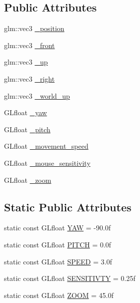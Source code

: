 \subsection*{Public Attributes}
\begin{DoxyCompactItemize}
\item 
glm\+::vec3 \hyperlink{classCamera_a0a931ed2051befaad1f482b3b5e98ca0}{\+\_\+position}
\item 
glm\+::vec3 \hyperlink{classCamera_ac610e748840c4b70c9081c2d68df2e8d}{\+\_\+front}
\item 
glm\+::vec3 \hyperlink{classCamera_a323a698e4c5773ee3ec380851b145e2d}{\+\_\+up}
\item 
glm\+::vec3 \hyperlink{classCamera_a4c556280ed181d8589c28eec7ebebb49}{\+\_\+right}
\item 
glm\+::vec3 \hyperlink{classCamera_aa5d721a01ba1cb41eafb02e39ea29e03}{\+\_\+world\+\_\+up}
\item 
G\+Lfloat \hyperlink{classCamera_ab815461cc043db1f5810c2f488641740}{\+\_\+yaw}
\item 
G\+Lfloat \hyperlink{classCamera_a23a8b8859c44721d7082b89809318918}{\+\_\+pitch}
\item 
G\+Lfloat \hyperlink{classCamera_a6f31b5658310866d3228614a755b59b0}{\+\_\+movement\+\_\+speed}
\item 
G\+Lfloat \hyperlink{classCamera_aeb483d642e0bcf11aa881467ac9676fe}{\+\_\+mouse\+\_\+sensitivity}
\item 
G\+Lfloat \hyperlink{classCamera_a99dc4d95f58be2427ff6c8d93c676ecd}{\+\_\+zoom}
\end{DoxyCompactItemize}
\subsection*{Static Public Attributes}
\begin{DoxyCompactItemize}
\item 
static const G\+Lfloat \hyperlink{classCamera_a79050e94e98c5c1cc0127c41edb4ed16}{Y\+AW} = -\/90.\+0f
\item 
static const G\+Lfloat \hyperlink{classCamera_afd43f32a47d2db8922dc32030fd84379}{P\+I\+T\+CH} = 0.\+0f
\item 
static const G\+Lfloat \hyperlink{classCamera_acc2ddbb4a3bdb2829896703edf72ca1e}{S\+P\+E\+ED} = 3.\+0f
\item 
static const G\+Lfloat \hyperlink{classCamera_ad682c7fc69bab5dbc3f8f10a1542b484}{S\+E\+N\+S\+I\+T\+I\+V\+TY} = 0.\+25f
\item 
static const G\+Lfloat \hyperlink{classCamera_a34cdfe4c17868880037d5ff78159f158}{Z\+O\+OM} = 45.\+0f
\end{DoxyCompactItemize}


